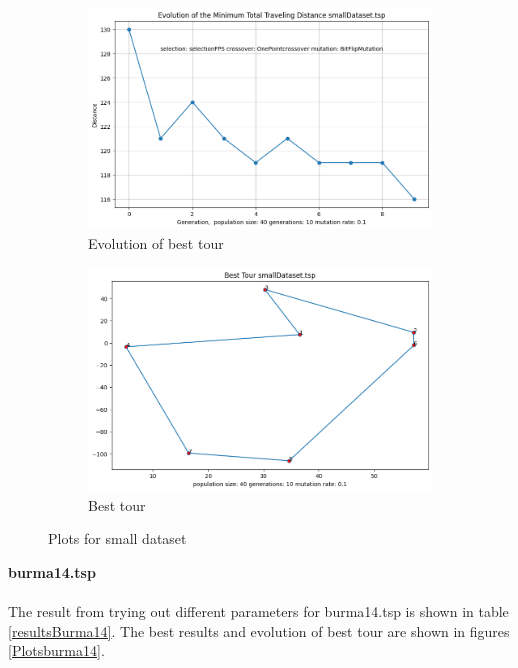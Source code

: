 \documentclass[12pt]{report}
\begin{document}
	\begin{figure}[H]
		\centering
		\begin{subfigure}{.5\textwidth}
			\centering
			\includegraphics[width=.99\linewidth]{../Results/smallDataset/EvolutionPlot.png}
			\caption{Evolution of best tour}
			\label{EvolutionSmallDataset}
		\end{subfigure}%
		\begin{subfigure}{.5\textwidth}
			\centering
			\includegraphics[width=.8\linewidth]{../Results/smallDataset/bestTour.png}
			\caption{Best tour}
			\label{bestTourSmallDataset}
		\end{subfigure}
		\caption{Plots for small dataset}
		\label{PlotsSmallDataset}
	\end{figure}
    \newpage
    \noindent \textbf{burma14.tsp}\\
    \\
    The result from trying out different parameters for burma14.tsp is shown in table \ref{resultsBurma14}. The best results and evolution of best tour are shown in figures \ref{Plotsburma14}. 
\end{document}
